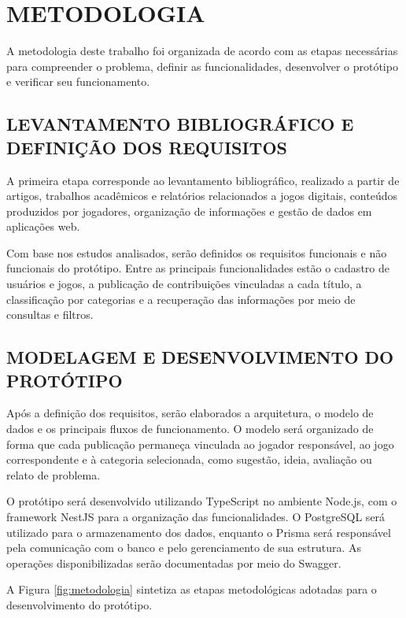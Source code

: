 \chapter{METODOLOGIA}

A metodologia deste trabalho foi organizada de acordo com as etapas necessárias para compreender o problema, definir as funcionalidades, desenvolver o protótipo e verificar seu funcionamento. 

\section{LEVANTAMENTO BIBLIOGRÁFICO E DEFINIÇÃO DOS REQUISITOS}

A primeira etapa corresponde ao levantamento bibliográfico, realizado a partir de artigos, trabalhos acadêmicos e relatórios relacionados a jogos digitais, conteúdos produzidos por jogadores, organização de informações e gestão de dados em aplicações web. 

Com base nos estudos analisados, serão definidos os requisitos funcionais e não funcionais do protótipo. Entre as principais funcionalidades estão o cadastro de usuários e jogos, a publicação de contribuições vinculadas a cada título, a classificação por categorias e a recuperação das informações por meio de consultas e filtros.

\section{MODELAGEM E DESENVOLVIMENTO DO PROTÓTIPO}

Após a definição dos requisitos, serão elaborados a arquitetura, o modelo de dados e os principais fluxos de funcionamento. O modelo será organizado de forma que cada publicação permaneça vinculada ao jogador responsável, ao jogo correspondente e à categoria selecionada, como sugestão, ideia, avaliação ou relato de problema.

O protótipo será desenvolvido utilizando TypeScript no ambiente Node.js, com o framework NestJS para a organização das funcionalidades. O PostgreSQL será utilizado para o armazenamento dos dados, enquanto o Prisma será responsável pela comunicação com o banco e pelo gerenciamento de sua estrutura. As operações disponibilizadas serão documentadas por meio do Swagger.

A Figura \ref{fig:metodologia} sintetiza as etapas metodológicas adotadas para o desenvolvimento do protótipo.

